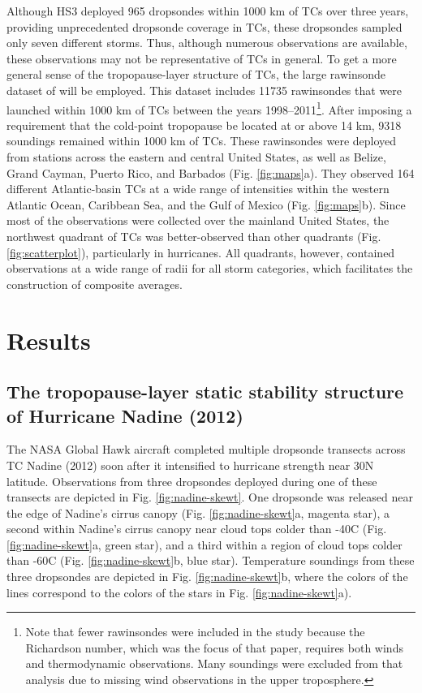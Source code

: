 Although HS3 deployed 965 dropsondes within 1000 km of TCs over three years, providing unprecedented dropsonde coverage in TCs, these dropsondes sampled only seven different storms.
Thus, although numerous observations are available, these observations may not be representative of TCs in general.
To get a more general sense of the tropopause-layer structure of TCs, the large rawinsonde dataset of \cite{DuranMolinari2016} will be employed.
This dataset includes 11735 rawinsondes that were launched within 1000 km of TCs between the years 1998--2011\footnote{Note that fewer rawinsondes were included in the \cite{DuranMolinari2016} study because the Richardson number, which was the focus of that paper, requires both winds and thermodynamic observations. Many soundings were excluded from that analysis due to missing wind observations in the upper troposphere.}.
After imposing a requirement that the cold-point tropopause be located at or above 14 km, 9318 soundings remained within 1000 km of TCs.
These rawinsondes were deployed from stations across the eastern and central United States, as well as Belize, Grand Cayman, Puerto Rico, and Barbados (Fig. \ref{fig:maps}a).
They observed 164 different Atlantic-basin TCs at a wide range of intensities within the western Atlantic Ocean, Caribbean Sea, and the Gulf of Mexico (Fig. \ref{fig:maps}b).
Since most of the observations were collected over the mainland United States, the northwest quadrant of TCs was better-observed than other quadrants (Fig. \ref{fig:scatterplot}), particularly in hurricanes.
All quadrants, however, contained observations at a wide range of radii for all storm categories, which facilitates the construction of composite averages.

\section{Results}
\subsection{The tropopause-layer static stability structure of Hurricane Nadine (2012)}
The NASA Global Hawk aircraft completed multiple dropsonde transects across TC Nadine (2012) soon after it intensified to hurricane strength near 30\textdegree{}N latitude.
Observations from three dropsondes deployed during one of these transects are depicted in Fig. \ref{fig:nadine-skewt}.
One dropsonde was released near the edge of Nadine's cirrus canopy (Fig. \ref{fig:nadine-skewt}a, magenta star), a second within Nadine's cirrus canopy near cloud tops colder than -40\textdegree{}C (Fig. \ref{fig:nadine-skewt}a, green star), and a third within a region of cloud tops colder than -60\textdegree{}C (Fig. \ref{fig:nadine-skewt}b, blue star).
Temperature soundings from these three dropsondes are depicted in Fig. \ref{fig:nadine-skewt}b, where the colors of the lines correspond to the colors of the stars in Fig. \ref{fig:nadine-skewt}a).

